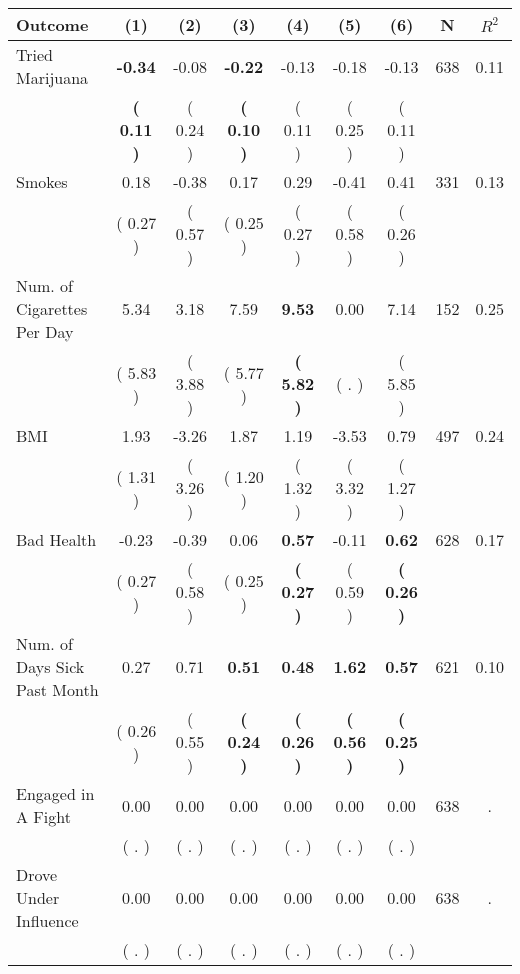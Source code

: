 \begin{tabular}{lcccccccc}
\toprule
 \textbf{Outcome} & \textbf{(1)} & \textbf{(2)} & \textbf{(3)} & \textbf{(4)} & \textbf{(5)} & \textbf{(6)} & \textbf{N} & \textbf{$ R^2$} \\
\midrule
Tried Marijuana & \textbf{    -0.34} &     -0.08 & \textbf{    -0.22} &     -0.13 &     -0.18 &     -0.13 & 638 &       0.11 \\ 
 & \textbf{(     0.11 )} & (     0.24 ) & \textbf{(     0.10 )} & (     0.11 ) & (     0.25 ) & (     0.11 ) & \\
Smokes &      0.18 &     -0.38 &      0.17 &      0.29 &     -0.41 &      0.41 & 331 &       0.13 \\ 
 & (     0.27 ) & (     0.57 ) & (     0.25 ) & (     0.27 ) & (     0.58 ) & (     0.26 ) & \\
Num. of Cigarettes Per Day &      5.34 &      3.18 &      7.59 & \textbf{     9.53} &      0.00 &      7.14 & 152 &       0.25 \\ 
 & (     5.83 ) & (     3.88 ) & (     5.77 ) & \textbf{(     5.82 )} & (        . ) & (     5.85 ) & \\
BMI &      1.93 &     -3.26 &      1.87 &      1.19 &     -3.53 &      0.79 & 497 &       0.24 \\ 
 & (     1.31 ) & (     3.26 ) & (     1.20 ) & (     1.32 ) & (     3.32 ) & (     1.27 ) & \\
Bad Health &     -0.23 &     -0.39 &      0.06 & \textbf{     0.57} &     -0.11 & \textbf{     0.62} & 628 &       0.17 \\ 
 & (     0.27 ) & (     0.58 ) & (     0.25 ) & \textbf{(     0.27 )} & (     0.59 ) & \textbf{(     0.26 )} & \\
Num. of Days Sick Past Month &      0.27 &      0.71 & \textbf{     0.51} & \textbf{     0.48} & \textbf{     1.62} & \textbf{     0.57} & 621 &       0.10 \\ 
 & (     0.26 ) & (     0.55 ) & \textbf{(     0.24 )} & \textbf{(     0.26 )} & \textbf{(     0.56 )} & \textbf{(     0.25 )} & \\
Engaged in A Fight &      0.00 &      0.00 &      0.00 &      0.00 &      0.00 &      0.00 & 638 &          . \\ 
 & (        . ) & (        . ) & (        . ) & (        . ) & (        . ) & (        . ) & \\
Drove Under Influence &      0.00 &      0.00 &      0.00 &      0.00 &      0.00 &      0.00 & 638 &          . \\ 
 & (        . ) & (        . ) & (        . ) & (        . ) & (        . ) & (        . ) & \\

\end{tabular}

